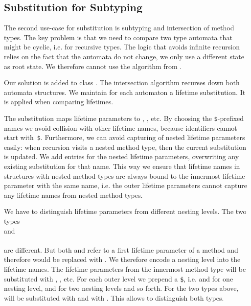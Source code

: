 \subsection{Substitution for Subtyping}\label{section:substitution-subtyping}
The second use-case for substitution is subtyping and intersection of method types.
The key problem is that we need to compare two type automata that might be cyclic, i.e. for recursive types.
The logic that avoids infinite recursion relies on the fact that the automata do not change, we only use a different state as root state.
We therefore cannot use the algorithm from .

Our solution is added to class .
The intersection algorithm recurses down both automata structures.
We maintain for each automaton a lifetime substitution.
It is applied when comparing lifetimes.

The substitution maps lifetime parameters to , , etc.
By choosing the \texttt{\$}-prefixed names we avoid collision with other lifetime names, because identifiers cannot start with~\texttt{\$}.
Furthermore, we can avoid capturing of nested lifetime parameters easily:
when recursion visits a nested method type, then the current substitution is updated.
We add entries for the nested lifetime parameters, overwriting any existing substitution for that name.
This way we ensure that lifetime names in structures with nested method types are always bound to the innermost lifetime parameter with the same name, i.e. the outer lifetime parameters cannot capture any lifetime names from nested method types.

We have to distinguish lifetime parameters from different nesting levels.
The two types\\
\hspace*{0.12\linewidth} and\\
\hspace*{0.12\linewidth}\\
are different.
But both  and  refer to a first lifetime parameter of a method and therefore would be replaced with . %
We therefore encode a nesting level into the lifetime names.
The lifetime parameters from the innermost method type will be substituted with , , etc.
For each outer level we prepend a \texttt{\$}, i.e.  and  for one nesting level,  and  for two nesting levels and so forth.
For the two types above,  will be substituted with  and  with .
This allows to distinguish both types.

